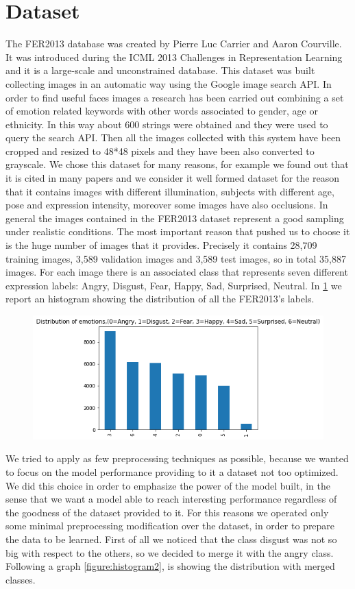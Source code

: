 \documentclass[10pt,twocolumn,letterpaper]{article}
\begin{document}
\section{Dataset}
The FER2013 database was created by Pierre Luc Carrier and Aaron Courville. It was introduced during the ICML 2013 Challenges in Representation Learning and it is a large-scale and unconstrained database. This dataset was built collecting images in an automatic way using the Google image search API. In order to find useful faces images a research has been carried out combining a set of emotion related keywords with other words associated to gender, age or ethnicity. In this way about 600 strings were obtained and they were used to query the search API. Then all the images collected with this system have been cropped and resized to 48*48 pixels and they have been also converted to grayscale. We chose this dataset for many reasons, for example we found out that it is cited in many papers and we consider it well formed dataset for the reason that it contains images with different illumination, subjects with different age, pose and expression intensity, moreover some images have also occlusions. In general the images contained in the FER2013 dataset represent a good sampling under realistic conditions. The most important reason that pushed us to choose it is the huge number of images that it provides. Precisely it contains 28,709 training images, 3,589 validation images and 3,589 test images, so in total 35,887 images. For each image there is an associated class that represents seven different expression labels: Angry, Disgust, Fear, Happy, Sad, Surprised, Neutral. In \ref{figure:histogram1} we report an histogram showing the distribution of all the FER2013's labels.
\begin{figure}[H]
   \centering
   \includegraphics[width=1\linewidth]{./immagini/7_classi.png}
   \label{figure:histogram1}
\end{figure}
We tried to apply as few preprocessing techniques as possible, because we wanted to focus on the model performance providing to it a dataset not too optimized. We did this choice in order to emphasize the power of the model built, in the sense that we want a model able to reach interesting performance regardless of the goodness of the dataset provided to it. For this reasons we operated only some minimal preprocessing modification over the dataset, in order to prepare the data to be learned. First of all we noticed that the class disgust was not so big with respect to the others, so we decided to merge it with the angry class. Following a graph \ref{figure:histogram2}, is showing the distribution with merged classes.
\end{document}
